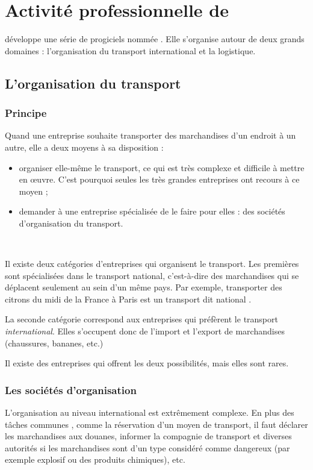 \chapter{Activité professionnelle de \solulog}
\label{activitepro_solulog}
\solulog{} développe une série de progiciels nommée \integrale. Elle s'organise autour de deux grands domaines : l'organisation du transport international et la logistique.

\section{L'organisation du transport}
\subsection{Principe}
Quand une entreprise souhaite transporter des marchandises d'un endroit à un autre, elle a deux moyens à sa disposition :
\begin{itemize}
	\item organiser elle-même le transport, ce qui est très complexe et difficile à mettre en \oe uvre. C'est pourquoi seules les très grandes entreprises ont recours à ce moyen ;
	\item demander à une entreprise spécialisée de le faire pour elles : des sociétés d'organisation du transport.
\end{itemize}

~

Il existe deux catégories d'entreprises qui organisent le transport. Les premières sont spécialisées dans le transport national, c'est-à-dire des marchandises qui se déplacent seulement au sein d'un même pays. Par exemple, transporter des citrons du midi de la France à Paris est un transport dit \og national \fg.

La seconde catégorie correspond aux entreprises qui préfèrent le transport \emph{international}. Elles s'occupent donc de l'import et l'export de marchandises (chaussures, bananes, etc.)

Il existe des entreprises qui offrent les deux possibilités, mais elles sont rares.


\subsection{Les sociétés d'organisation}
L'organisation au niveau international est extrêmement complexe. En plus des tâches \og communes \fg {}, comme la réservation d'un moyen de transport, il faut déclarer les marchandises aux douanes, informer la compagnie de transport et diverses autorités si les marchandises sont d'un type considéré comme dangereux (par exemple explosif ou des produits chimiques), etc.

